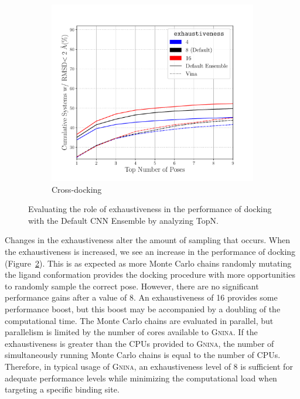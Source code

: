 \documentclass[journal=jcisd8,manuscript=article]{achemso}
\begin{document}
\begin{figure}
\begin{subfigure}[b]{0.48\textwidth}
		\includegraphics[width=\textwidth]{figures/crossdocking/sweep_exhaustiveness_line.pdf}
		\caption{Cross-docking}
		\label{fig:exhaustiveness cd}
        \end{subfigure}    
	\caption{Evaluating the role of exhaustiveness in the performance of docking with the Default CNN Ensemble by analyzing TopN.}
	\label{fig:exhaustiveness}
\end{figure}    

Changes in the exhaustiveness alter the amount of sampling that occurs. When the exhaustiveness is increased, we see an increase in the performance of docking (Figure~\ref{fig:exhaustiveness}). This is as expected as more Monte Carlo chains randomly mutating the ligand conformation provides the docking procedure with more opportunities to randomly sample the correct pose. However, there are no significant performance gains after a value of 8. An exhaustiveness of 16 provides some performance boost, but this boost may be accompanied by a doubling of the computational time. The Monte Carlo chains are evaluated in parallel, but parallelism is limited by the number of cores available to \textsc{Gnina}. If the exhaustiveness is greater than the CPUs provided to \textsc{Gnina}, the number of simultaneously running Monte Carlo chains is equal to the number of CPUs. Therefore, in typical usage of \textsc{Gnina}, an exhaustiveness level of 8 is sufficient for adequate performance levels while minimizing the computational load when targeting a specific binding site. 
\end{document}
